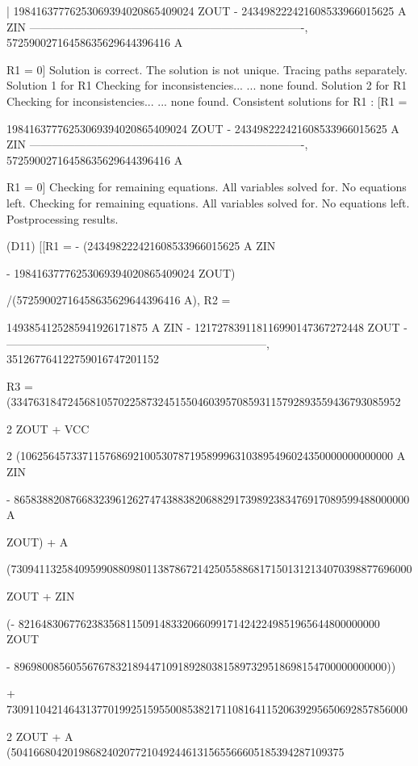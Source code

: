 \begin{literatim}{|}
19841637776253069394020865409024 ZOUT - 243498222421608533966015625 A ZIN
-------------------------------------------------------------------------, 
                     57259002716458635629644396416 A

R1 = 0]
Solution is correct.
The solution is not unique. Tracing paths separately.
Solution 1 for R1
Checking for inconsistencies...
... none found.
Solution 2 for R1
Checking for inconsistencies...
... none found.
Consistent solutions for R1 : [R1 = 

19841637776253069394020865409024 ZOUT - 243498222421608533966015625 A ZIN
-------------------------------------------------------------------------, 
                     57259002716458635629644396416 A

R1 = 0]
Checking for remaining equations.
All variables solved for. No equations left.
Checking for remaining equations.
All variables solved for. No equations left.
Postprocessing results.

(D11) [[R1 = - (243498222421608533966015625 A ZIN

 - 19841637776253069394020865409024 ZOUT)

/(57259002716458635629644396416 A), R2 = 

  1493854125285941926171875 A ZIN - 121727839118116990147367272448 ZOUT
- ---------------------------------------------------------------------, 
                       351267764122759016747201152

R3 = (334763184724568105702258732451550460395708593115792893559436793085952

     2
 ZOUT  + VCC

                                                                      2
 (106256457337115768692100530787195899963103895496024350000000000000 A  ZIN

 - 8658388208766832396126274743883820688291739892383476917089599488000000 A

 ZOUT) + A

 (73094113258409599088098011387867214250558868171501312134070398877696000

 ZOUT + ZIN

 (- 8216483067762383568115091483320660991714242249851965644800000000 ZOUT

 - 896980085605567678321894471091892803815897329518698154700000000000))

 + 73091104214643137701992515955008538217110816411520639295650692857856000

         2
 ZOUT + A  (50416680420198682402077210492446131565566605185394287109375


\end{literatim}
